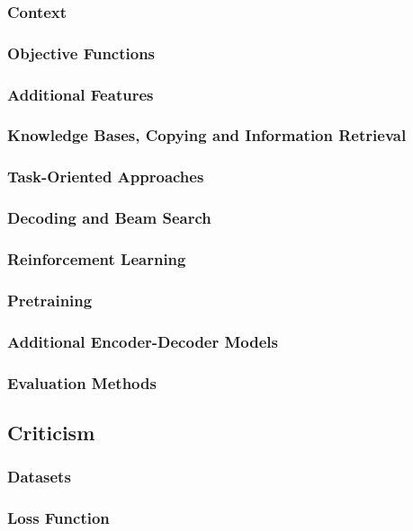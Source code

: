 \documentclass[12pt]{article}
\begin{document}
\subsubsection{Context}
\subsubsection{Objective Functions}
\subsubsection{Additional Features}
\subsubsection{Knowledge Bases, Copying and Information Retrieval}
\subsubsection{Task-Oriented Approaches}
\subsubsection{Decoding and Beam Search}
\subsubsection{Reinforcement Learning}
\subsubsection{Pretraining}
\subsubsection{Additional Encoder-Decoder Models}
\subsubsection{Evaluation Methods}

\subsection{Criticism} \label{ssec:32}
\subsubsection{Datasets}
\subsubsection{Loss Function}
\end{document}
